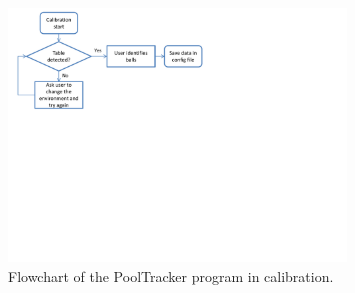 \begin{figure}[H]
\begin{center}
\leavevmode
\includegraphics[width=0.8\textwidth]{images/calib_flowchart}
\end{center}
\caption{Flowchart of the PoolTracker program in calibration.}
\label{fig:calib_flowchart}
\end{figure}

